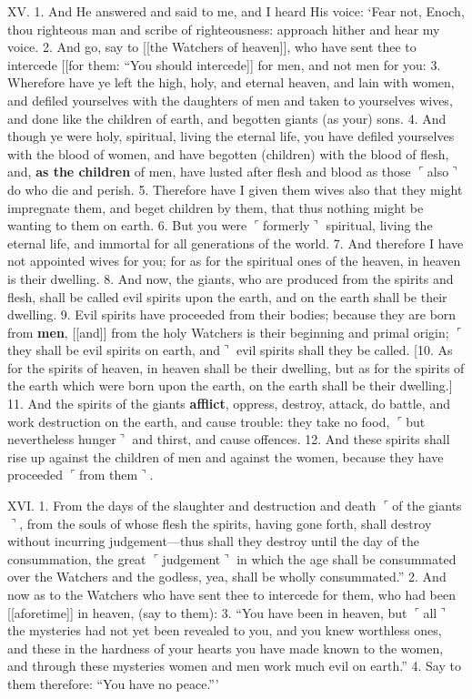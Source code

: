 XV. 1. And He answered and said to me, and I
heard His voice: ‘Fear not, Enoch, thou righteous
man and scribe of righteousness: approach hither
and hear my voice. 2. And go, say to [[the Watchers
of heaven]], who have sent thee to intercede [[for
them: “You should intercede]] for men, and not
men for you: 3. Wherefore have ye left the high,
holy, and eternal heaven, and lain with women, and
defiled yourselves with the daughters of men and
taken to yourselves wives, and done like the children
of earth, and begotten giants (as your) sons. 4. And
though ye were holy, spiritual, living the eternal
life, you have defiled yourselves with the blood of
women, and have begotten (children) with the blood
of flesh, and, \textbf{as the children} of men, have lusted
after flesh and blood as those $\ulcorner$also$\urcorner$ do who die and
perish. 5. Therefore have I given them wives also
that they might impregnate them, and beget children
by them, that thus nothing might be wanting to
them on earth. 6. But you were $\ulcorner$formerly$\urcorner$ spiritual,
living the eternal life, and immortal for all generations
of the world. 7. And therefore I have not appointed
wives for you; for as for the spiritual ones of the
heaven, in heaven is their dwelling. 8. And now,
the giants, who are produced from the spirits and
flesh, shall be called evil spirits upon the earth, and
on the earth shall be their dwelling. 9. Evil spirits
have proceeded from their bodies; because they are
born from \textbf{men}, [[and]] from the holy Watchers is their
beginning and primal origin; $\ulcorner$they shall be evil spirits
on earth, and$\urcorner$ evil spirits shall they be called. [10. As
for the spirits of heaven, in heaven shall be their
dwelling, but as for the spirits of the earth which
were born upon the earth, on the earth shall be their
dwelling.] 11. And the spirits of the giants \textbf{afflict},
oppress, destroy, attack, do battle, and work destruction
on the earth, and cause trouble: they take
no food, $\ulcorner$but nevertheless hunger$\urcorner$ and thirst, and
cause offences. 12. And these spirits shall rise up
against the children of men and against the women,
because they have proceeded $\ulcorner$from them$\urcorner$.

XVI. 1. From the days of the slaughter and destruction
and death $\ulcorner$of the giants$\urcorner$, from the souls of
whose flesh the spirits, having gone forth, shall
destroy without incurring judgement—thus shall
they destroy until the day of the consummation,
the great $\ulcorner$judgement$\urcorner$ in which the age shall be consummated
over the Watchers and the godless, yea,
shall be wholly consummated.” 2. And now as
to the Watchers who have sent thee to intercede for
them, who had been [[aforetime]] in heaven, (say to
them): 3. “You have been in heaven, but $\ulcorner$all$\urcorner$
the mysteries had not yet been revealed to you, and
you knew worthless ones, and these in the hardness
of your hearts you have made known to the women,
and through these mysteries women and men work
much evil on earth.” 4. Say to them therefore:
“You have no peace.”’

